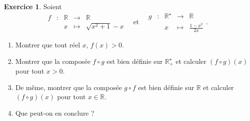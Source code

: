 \documentclass[a4paper, 11pt,openany]{article}%
\theoremstyle{plain}
\theoremstyle{definition}
\newtheorem{exo}{Exercice}
\theoremstyle{remark}
\newcommand{\R}{\mathbb{R}}
\begin{document}
\begin{exo}
Soient
\[  \begin{array}{ccccc}
f & : & \R & \to & \R \\
 & & x & \mapsto & \sqrt{x^2+1} - x
\end{array} \quad \text{et} \quad \begin{array}{ccccc}
g & : & \R^{\star} & \to & \R \\
 & & x& \mapsto & \frac{1-x^2}{2x}
\end{array}.\]
\begin{enumerate}
\item Montrer que tout réel $x$, $f(x) > 0$.
\item Montrer que la composée $f \circ g$ est bien définie sur $\R_+^{\star}$ et calculer $(f \circ g)(x)$ pour tout $x > 0$.
\item De même, montrer que la composée $g \circ f$ est bien définie sur $\R$ et calculer $(f \circ g)(x)$ pour tout $x \in \R$.
\item Que peut-on en conclure ?
\end{enumerate}
\end{exo}
\end{document}
